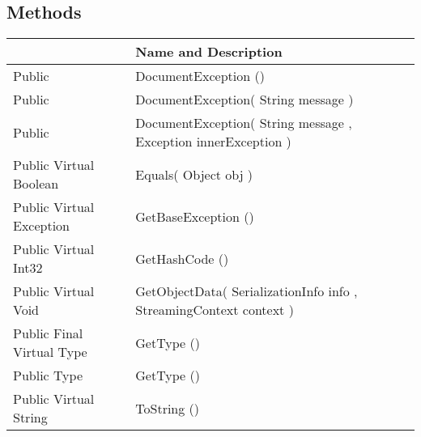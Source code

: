 \documentclass[11pt, oneside, a4paper]{book}
\begin{document}
\subsection{Methods}
\begin{center}
\begin{tabular}{| p{3cm} | p{12cm} | }
\hline
\textbf{ } & \textbf{ Name and Description}\\
\hline
 Public  &  DocumentException ()\hypertarget{SoftwareEngineeringTools.{}Documentation.{}DocumentException.{}DocumentException}{}\\
\hline
 Public  &  DocumentException(\hypertarget{SoftwareEngineeringTools.{}Documentation.{}DocumentException.{}DocumentException\_String}{} String  message  )\\
\hline
 Public  &  DocumentException(\hypertarget{SoftwareEngineeringTools.{}Documentation.{}DocumentException.{}DocumentException\_String\_Exception}{} String  message  ,  Exception  innerException  )\\
\hline
 Public  Virtual  Boolean &  Equals(\hypertarget{SoftwareEngineeringTools.{}Documentation.{}DocumentException.{}Equals\_Object}{} Object  obj  )\\
\hline
 Public  Virtual  Exception &  GetBaseException ()\hypertarget{SoftwareEngineeringTools.{}Documentation.{}DocumentException.{}GetBaseException}{}\\
\hline
 Public  Virtual  Int32 &  GetHashCode ()\hypertarget{SoftwareEngineeringTools.{}Documentation.{}DocumentException.{}GetHashCode}{}\\
\hline
 Public  Virtual  Void &  GetObjectData(\hypertarget{SoftwareEngineeringTools.{}Documentation.{}DocumentException.{}GetObjectData\_SerializationInfo\_StreamingContext}{} SerializationInfo  info  ,  StreamingContext  context  )\\
\hline
 Public  Final  Virtual  Type &  GetType ()\hypertarget{SoftwareEngineeringTools.{}Documentation.{}DocumentException.{}GetType}{}\\
\hline
 Public  Type &  GetType ()\hypertarget{SoftwareEngineeringTools.{}Documentation.{}DocumentException.{}GetType}{}\\
\hline
 Public  Virtual  String &  ToString ()\hypertarget{SoftwareEngineeringTools.{}Documentation.{}DocumentException.{}ToString}{}\\
\hline
\end{tabular}
\end{center}
 


\hypertarget{SoftwareEngineeringTools.{}Documentation.{}DocumentGenerator}{}
\end{document}
